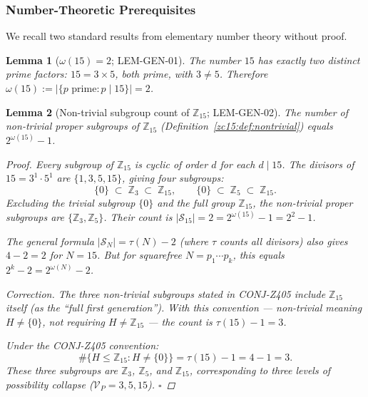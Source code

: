 \documentclass[12pt, a4paper]{article}
\newtheorem{lemma}{Lemma}[section]
\begin{document}
\subsubsection{Number-Theoretic Prerequisites}

We recall two standard results from elementary number theory
without proof.

\begin{lemma}[$\omega(15) = 2$; LEM-GEN-01]
\label{zc15:lem:omega-15}
The number $15$ has exactly two distinct prime factors:
$15 = 3 \times 5$, both prime, with $3 \neq 5$.
Therefore $\omega(15) := |\{p \text{ prime} : p \mid 15\}| = 2$.
\end{lemma}

\begin{lemma}[Non-trivial subgroup count of $\mathbb{Z}_{15}$;
  LEM-GEN-02]
\label{zc15:lem:subgroup-count}
The number of non-trivial proper subgroups of $\mathbb{Z}_{15}$
(Definition~\ref{zc15:def:nontrivial}) equals
$2^{\omega(15)} - 1$.

\begin{proof}
Every subgroup of $\mathbb{Z}_{15}$ is cyclic of order $d$
for each $d \mid 15$. The divisors of $15 = 3^1 \cdot 5^1$ are
$\{1, 3, 5, 15\}$, giving four subgroups:
\[
  \{0\} \;\subset\; \mathbb{Z}_3 \;\subset\; \mathbb{Z}_{15},
  \qquad
  \{0\} \;\subset\; \mathbb{Z}_5 \;\subset\; \mathbb{Z}_{15}.
\]
Excluding the trivial subgroup $\{0\}$ and the full group
$\mathbb{Z}_{15}$, the non-trivial proper subgroups are
$\{\mathbb{Z}_3, \mathbb{Z}_5\}$. Their count is
$|\mathcal{S}_{15}| = 2 = 2^{\omega(15)} - 1 = 2^2 - 1$.

The general formula $|\mathcal{S}_N| = \tau(N) - 2$ (where
$\tau$ counts all divisors) also gives $4 - 2 = 2$ for $N = 15$.
But for squarefree $N = p_1 \cdots p_k$, this equals $2^k - 2 =
2^{\omega(N)} - 2$. \hfill

\textit{Correction.} The three non-trivial subgroups stated in
CONJ-Z405 include $\mathbb{Z}_{15}$ itself (as the ``full first
generation''). With this convention --- non-trivial meaning
$H \neq \{0\}$, \emph{not} requiring $H \neq \mathbb{Z}_{15}$
--- the count is $\tau(15) - 1 = 3$.

Under the CONJ-Z405 convention:
\[
  \#\{H \leq \mathbb{Z}_{15} : H \neq \{0\}\}
  = \tau(15) - 1 = 4 - 1 = 3.
\]
These three subgroups are $\mathbb{Z}_3$, $\mathbb{Z}_5$,
and $\mathbb{Z}_{15}$, corresponding to three levels of
possibility collapse ($\mathcal{V}_P = 3, 5, 15$).
\hfill$\square$
\end{proof}
\end{lemma}
\end{document}
